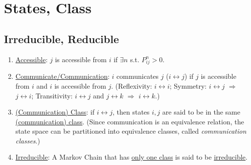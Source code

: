 \documentclass[11pt]{elegantbook}
\begin{document}
\section{States, Class}
\subsection{Irreducible, Reducible}
\begin{enumerate}[$\bullet$]
    \item \underline{Accessible}: $j$ is accessible from $i$ if $\exists n$ s.t. $P_{ij}^n>0$.
    \item \underline{Communicate/Communication}: $i$ communicates $j$ ($i \leftrightarrow j$) if $j$ is accessible from $i$ and $i$ is accessible from $j$. (Reflexivity: $i \leftrightarrow i$; Symmetry: $i \leftrightarrow j$ $\Rightarrow$ $j \leftrightarrow i$; Transitivity: $i \leftrightarrow j$ and $j \leftrightarrow k$ $\Rightarrow$ $i \leftrightarrow k$.)
    \item \underline{(Communication) Class}: if $i \leftrightarrow j$, then states $i,j$ are said to be in the same \underline{(communication) class}. (Since communication is an equivalence relation, the state space can be partitioned into equivalence classes, called \textit{communication classes}.)
    \item \underline{Irreducible}: A Markov Chain that has \underline{only one class} is said to be \underline{irreducible}.
\end{enumerate}
\end{document}
